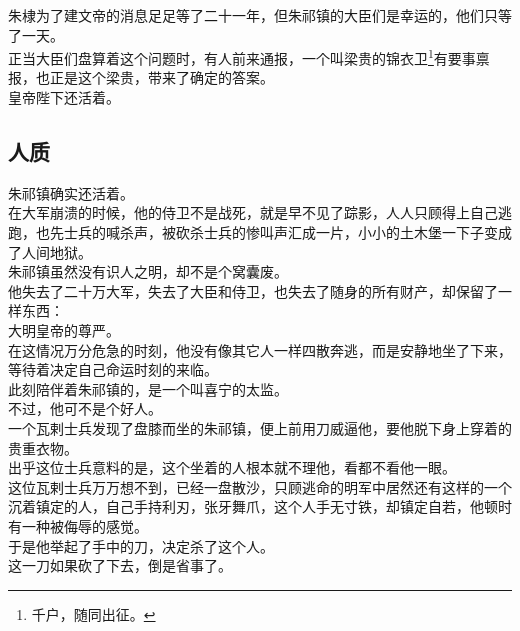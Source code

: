 \begin{multicols}{\theparacolNo}
朱棣为了建文帝的消息足足等了二十一年，但朱祁镇的大臣们是幸运的，他们只等了一天。\\

正当大臣们盘算着这个问题时，有人前来通报，一个叫梁贵的锦衣卫\footnote{千户，随同出征。}有要事禀报，也正是这个梁贵，带来了确定的答案。\\

皇帝陛下还活着。\\

\subsection{人质}
朱祁镇确实还活着。\\

在大军崩溃的时候，他的侍卫不是战死，就是早不见了踪影，人人只顾得上自己逃跑，也先士兵的喊杀声，被砍杀士兵的惨叫声汇成一片，小小的土木堡一下子变成了人间地狱。\\

朱祁镇虽然没有识人之明，却不是个窝囊废。\\

他失去了二十万大军，失去了大臣和侍卫，也失去了随身的所有财产，却保留了一样东西：\\

大明皇帝的尊严。\\

在这情况万分危急的时刻，他没有像其它人一样四散奔逃，而是安静地坐了下来，等待着决定自己命运时刻的来临。\\

此刻陪伴着朱祁镇的，是一个叫喜宁的太监。\\

不过，他可不是个好人。\\

一个瓦剌士兵发现了盘膝而坐的朱祁镇，便上前用刀威逼他，要他脱下身上穿着的贵重衣物。\\

出乎这位士兵意料的是，这个坐着的人根本就不理他，看都不看他一眼。\\

这位瓦剌士兵万万想不到，已经一盘散沙，只顾逃命的明军中居然还有这样的一个沉着镇定的人，自己手持利刃，张牙舞爪，这个人手无寸铁，却镇定自若，他顿时有一种被侮辱的感觉。\\

于是他举起了手中的刀，决定杀了这个人。\\

这一刀如果砍了下去，倒是省事了。\\


\end{multicols}
